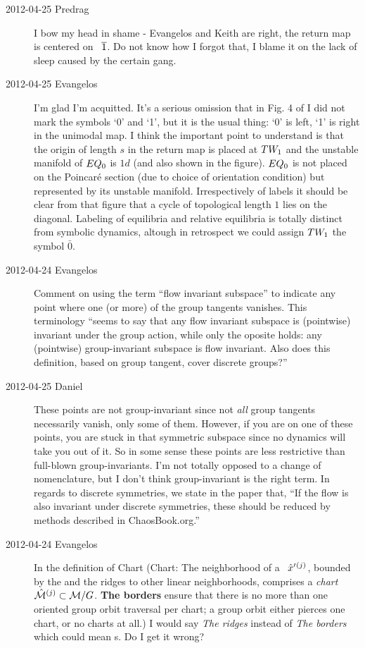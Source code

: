 \begin{description}
\item[2012-04-25 Predrag] I bow my head in shame - Evangelos and Keith
are right, the return map is centered on \rpo\ $\overline{1}$. Do not know
how I forgot that, I blame it on the lack of  sleep caused by the certain
gang.

\item[2012-04-25 Evangelos] I'm glad I'm acquitted. It's a serious omission that in Fig. 4
of  I did not mark the symbols `0' and `1', but it is the
usual thing: `0' is left, `1' is right in the unimodal map.
I think the important point to
understand is that the origin of length $s$ in the return map is placed at $TW_{1}$
and the unstable manifold of $EQ_{0}$ is $1d$ (and also shown in the figure).
$EQ_{0}$ is not placed on the Poincar\'e section (due to choice of orientation
condition) but represented by its unstable manifold.
Irrespectively of labels it should be clear from that figure that a
cycle of topological length $1$ lies on the diagonal. Labeling of equilibria
and relative equilibria is totally distinct from symbolic dynamics, altough in
retrospect we could assign $TW_{1}$ the symbol $\bar{0}$.

\item[2012-04-24 Evangelos] Comment on using the term ``flow invariant subspace'' to indicate any point where one (or more) of the group tangents vanishes. This terminology ``seems to say that any flow invariant subspace is (pointwise) invariant under the group action, while only the oposite holds: any (pointwise) group-invariant subspace is flow invariant. Also does this definition, based on group tangent, cover discrete groups?''

\item[2012-04-25 Daniel] These points are not group-invariant since not \emph{all} group tangents necessarily vanish, only some of them. However, if you are on one of these points, you are stuck in that symmetric subspace since no dynamics will take you out of it. So in some sense these points are less restrictive than full-blown group-invariants. I'm not totally opposed to a change of nomenclature, but I don't think group-invariant is the right term.
In regards to discrete symmetries, we state in the paper that, ``If the flow is also invariant under discrete symmetries, these should be reduced by methods described in ChaosBook.org.''

\item[2012-04-24 Evangelos] In the definition of Chart (Chart: The neighborhood of a \template\ ${\hat{x}'}{}^{(j)}$, bounded by the {\chartBord} and the ridges to other linear neighborhoods, comprises a \emph{chart} $\hat{\cal M}{}^{(j)} \subset {\cal M}/G$. {\bf The
borders} ensure that there is no more than one oriented group orbit traversal per chart; a group orbit either pierces one chart, or no charts at all.) I would say \emph{The ridges} instead of \emph{The borders} which could mean \ChartBord s. Do I get it wrong?


\end{description}
